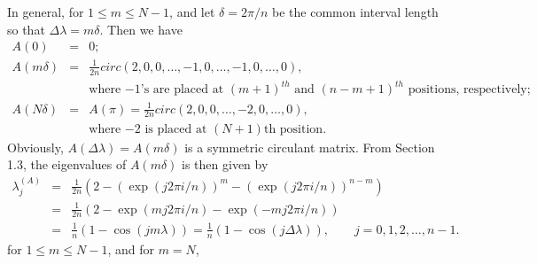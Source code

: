 
In general, for $1 \le m \le N-1$, and let $\delta = 2\pi/n$ be the common interval length so that $\Delta \lambda = m\delta$. Then we have
\begin{eqnarray*}
A(0) &=& 0; \\
A(m\delta) &=& \frac{1}{2n}circ(2, 0, 0, \ldots, -1, 0, \ldots, -1, 0, \ldots, 0), \\
& & \mbox{where $-1$'s are placed at $(m+1)^{th}$ and $(n-m+1)^{th}$ positions, respectively;} \\
A(N\delta) &=& A(\pi) = \frac{1}{2n}circ(2, 0, 0, \ldots, -2, 0, \ldots, 0),\\
& & \mbox{where $-2$ is placed at $(N+1)$th position.}
\end{eqnarray*}
Obviously, $A(\Delta \lambda) = A(m\delta)$ is a symmetric circulant matrix. From Section 1.3, the eigenvalues of $A(m \delta)$ is then given by
\begin{eqnarray*}
\lambda_j^{(A)} &=& \frac{1}{2n}(2 - (\exp(j2\pi i/n))^m - (\exp(j2\pi i/n))^{n-m}) \\
&=& \frac{1}{2n}(2 - \exp(mj2\pi i/n) - \exp(-mj2\pi i/n)) \\
&=& \frac{1}{n}(1 - \cos(jm\lambda)) = \frac{1}{n}(1 - \cos(j\Delta \lambda)), \quad \quad j = 0, 1, 2, \ldots, n-1.
\end{eqnarray*}
for $1 \le m \le N-1$, and for $m = N$,

